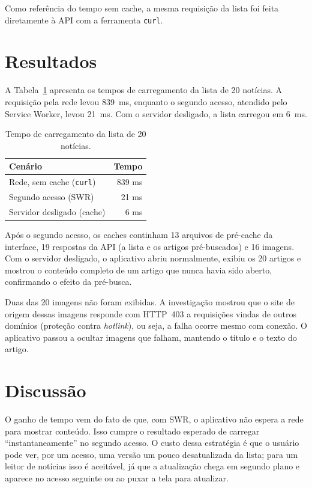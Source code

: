 \documentclass[preprint,10pt,5p]{elsarticle}
\begin{document}
Como referência do tempo sem cache, a mesma requisição da lista foi feita diretamente à API com a ferramenta \texttt{curl}.


\section{Resultados}
\label{results}

A Tabela~\ref{tab:tempos} apresenta os tempos de carregamento da lista de 20 notícias. A requisição pela rede levou 839~ms, enquanto o segundo acesso, atendido pelo Service Worker, levou 21~ms. Com o servidor desligado, a lista carregou em 6~ms.

\begin{table}[h]
\centering
\caption{Tempo de carregamento da lista de 20 notícias.}
\label{tab:tempos}
\begin{tabular}{lr}
\toprule
Cenário & Tempo \\
\midrule
Rede, sem cache (\texttt{curl}) & 839 ms \\
Segundo acesso (SWR) & 21 ms \\
Servidor desligado (cache) & 6 ms \\
\bottomrule
\end{tabular}
\end{table}

Após o segundo acesso, os caches continham 13 arquivos de pré-cache da interface, 19 respostas da API (a lista e os artigos pré-buscados) e 16 imagens. Com o servidor desligado, o aplicativo abriu normalmente, exibiu os 20 artigos e mostrou o conteúdo completo de um artigo que nunca havia sido aberto, confirmando o efeito da pré-busca.

Duas das 20 imagens não foram exibidas. A investigação mostrou que o site de origem dessas imagens responde com HTTP~403 a requisições vindas de outros domínios (proteção contra \textit{hotlink}), ou seja, a falha ocorre mesmo com conexão. O aplicativo passou a ocultar imagens que falham, mantendo o título e o texto do artigo.


\section{Discussão}
\label{discussion}

O ganho de tempo vem do fato de que, com SWR, o aplicativo não espera a rede para mostrar conteúdo. Isso cumpre o resultado esperado de carregar ``instantaneamente'' no segundo acesso. O custo dessa estratégia é que o usuário pode ver, por um acesso, uma versão um pouco desatualizada da lista; para um leitor de notícias isso é aceitável, já que a atualização chega em segundo plano e aparece no acesso seguinte ou ao puxar a tela para atualizar.
\end{document}
